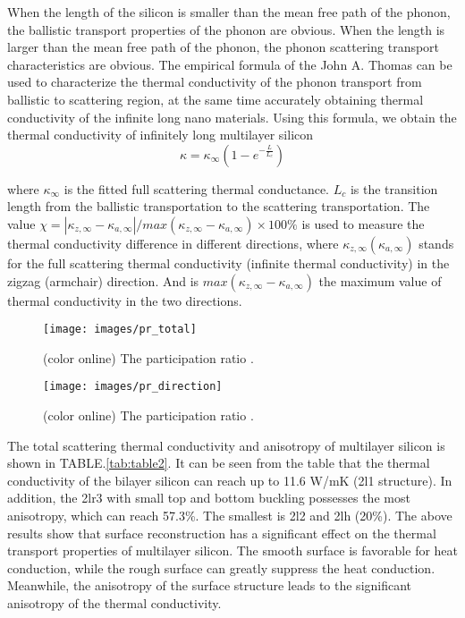 \documentclass[%
 reprint,
 amsmath,amssymb,
 aps,
 prb,
]{revtex4-1}
\begin{document}
When the length of the silicon is smaller than the mean free path of the phonon, the ballistic transport properties of the phonon are obvious. When the length is larger than the mean free path of the phonon, the phonon scattering transport characteristics are obvious. The empirical formula of the John A. Thomas\cite{Thomas2010} can be used to characterize the thermal conductivity of the phonon transport from ballistic to scattering region, at the same time accurately obtaining thermal conductivity of the infinite long nano materials. Using this formula, we obtain the thermal conductivity of infinitely long multilayer silicon
\begin{equation}
\kappa = \kappa_\infty (1-e^{-\frac{L}{L_c}})
\end{equation}

where $\kappa_\infty$ is the fitted full scattering thermal conductance. $L_c$ is the transition length from the ballistic transportation to the scattering transportation. The value $ \chi=|\kappa_{z,\infty}-\kappa_{a,\infty} |/max⁡(\kappa_{z,\infty}-\kappa_{a,\infty} ) \times 100 \%$ is used to measure the thermal conductivity difference in different directions, where $ \kappa_{z,\infty} (\kappa_{a,\infty})$ stands for the full scattering thermal conductivity (infinite thermal conductivity) in the zigzag (armchair) direction. And is $ max⁡(\kappa_{z,\infty}-\kappa_{a,\infty} ) $ the maximum value of thermal conductivity in the two directions. 

\begin{figure}[b]
\texttt{[image: images/pr\_total]}
\caption{\label{fig:pr_total} (color online) The participation ratio .}
\end{figure}

\begin{figure}[b]
\texttt{[image: images/pr\_direction]}
\caption{\label{fig:pr_direction} (color online) The participation ratio .}
\end{figure}

The total scattering thermal conductivity and anisotropy of multilayer silicon is shown in TABLE.\ref{tab:table2}. It can be seen from the table that the thermal conductivity of the bilayer silicon can reach up to 11.6 W/mK (2l1 structure). In addition, the 2lr3 with small top and bottom buckling possesses the most anisotropy, which can reach 57.3\%. The smallest is 2l2 and 2lh (20\%). The above results show that surface reconstruction has a significant effect on the thermal transport properties of multilayer silicon. The smooth surface is favorable for heat conduction, while the rough surface can greatly suppress the heat conduction. Meanwhile, the anisotropy of the surface structure leads to the significant anisotropy of the thermal conductivity.
\end{document}
